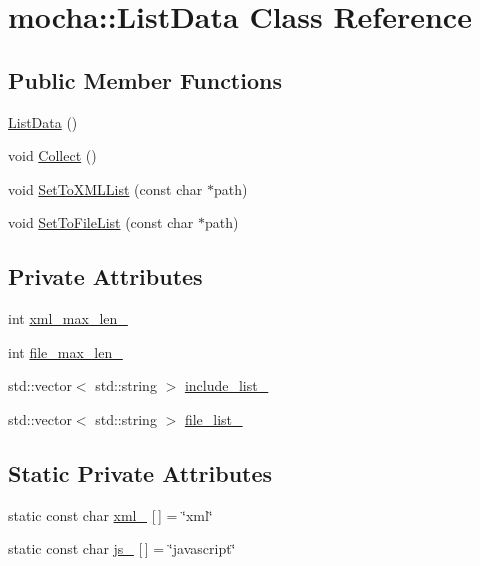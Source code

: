 \hypertarget{classmocha_1_1_list_data}{
\section{mocha::ListData Class Reference}
\label{classmocha_1_1_list_data}
}
\subsection*{Public Member Functions}
\begin{DoxyCompactItemize}
\item 
\hyperlink{classmocha_1_1_list_data_a8acb7f4d88c380c3d6bba3a35c4bfbec}{ListData} ()
\item 
void \hyperlink{classmocha_1_1_list_data_aef62773286677e2646086b42f8c61cc4}{Collect} ()
\item 
void \hyperlink{classmocha_1_1_list_data_a4283047426d8befe7885f03a429d8d41}{SetToXMLList} (const char $\ast$path)
\item 
void \hyperlink{classmocha_1_1_list_data_a7326c1cdc06e1a4d6a92f80fd76dc237}{SetToFileList} (const char $\ast$path)
\end{DoxyCompactItemize}
\subsection*{Private Attributes}
\begin{DoxyCompactItemize}
\item 
int \hyperlink{classmocha_1_1_list_data_ae618b9825f02e59fa937652d53cb7d04}{xml\_\-max\_\-len\_\-}
\item 
int \hyperlink{classmocha_1_1_list_data_a4053612ff8073fb21f493efd5e2c0211}{file\_\-max\_\-len\_\-}
\item 
std::vector$<$ std::string $>$ \hyperlink{classmocha_1_1_list_data_ae509490b409f30f671174f2461cd47fd}{include\_\-list\_\-}
\item 
std::vector$<$ std::string $>$ \hyperlink{classmocha_1_1_list_data_ad662f7359e651073fd6874c884a82445}{file\_\-list\_\-}
\end{DoxyCompactItemize}
\subsection*{Static Private Attributes}
\begin{DoxyCompactItemize}
\item 
static const char \hyperlink{classmocha_1_1_list_data_a252cac8a2b901e070658b35d493c9e4e}{xml\_\-} \mbox{[}$\,$\mbox{]} = \char`\"{}xml\char`\"{}
\item 
static const char \hyperlink{classmocha_1_1_list_data_afc7ac4f9f909eb970989228d912cd825}{js\_\-} \mbox{[}$\,$\mbox{]} = \char`\"{}javascript\char`\"{}
\end{DoxyCompactItemize}
